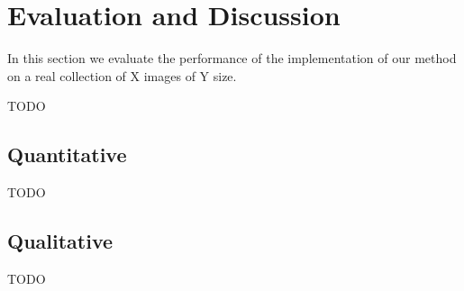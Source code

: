 \section{Evaluation and Discussion}\label{sec:performance}

In this section we evaluate the performance of
the implementation of our method
on a real collection of X images of Y size.
\begin{edit}
TODO
\end{edit}

\subsection{Quantitative}\label{ssec:quant}
\begin{edit}
TODO
\end{edit}


\subsection{Qualitative}\label{ssec:qual}
\begin{edit}
TODO
\end{edit}

